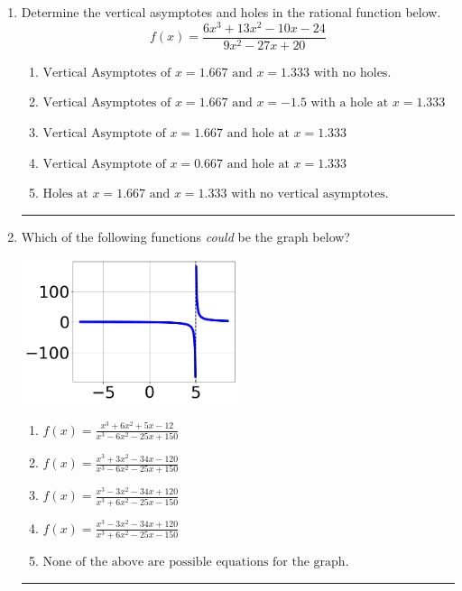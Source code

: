 \documentclass[14pt]{extbook}
\newcommand{\litem}[1]{\item#1\hspace*{-1cm}\rule{\textwidth}{0.4pt}}
\begin{document}
\begin{enumerate}
{\begin{enumerate}[label=\Alph*.]
\end{enumerate} }
\litem{
Determine the vertical asymptotes and holes in the rational function below.\[ f(x) = \frac{6x^{3} +13 x^{2} -10 x -24}{9x^{2} -27 x + 20} \]\begin{enumerate}[label=\Alph*.]
\item \( \text{Vertical Asymptotes of } x = 1.667 \text{ and } x = 1.333 \text{ with no holes.} \)
\item \( \text{Vertical Asymptotes of } x = 1.667 \text{ and } x = -1.5 \text{ with a hole at } x = 1.333 \)
\item \( \text{Vertical Asymptote of } x = 1.667 \text{ and hole at } x = 1.333 \)
\item \( \text{Vertical Asymptote of } x = 0.667 \text{ and hole at } x = 1.333 \)
\item \( \text{Holes at } x = 1.667 \text{ and } x = 1.333 \text{ with no vertical asymptotes.} \)

\end{enumerate} }
\litem{
Which of the following functions \textit{could} be the graph below?
\begin{center}
    \includegraphics[width=0.5\textwidth]{../Figures/identifyGraphOfRationalFunctionC.png}
\end{center}
\begin{enumerate}[label=\Alph*.]
\item \( f(x)=\frac{x^{3} +6 x^{2} +5 x -12}{x^{3} -6 x^{2} -25 x + 150} \)
\item \( f(x)=\frac{x^{3} +3 x^{2} -34 x -120}{x^{3} -6 x^{2} -25 x + 150} \)
\item \( f(x)=\frac{x^{3} -3 x^{2} -34 x + 120}{x^{3} +6 x^{2} -25 x -150} \)
\item \( f(x)=\frac{x^{3} -3 x^{2} -34 x + 120}{x^{3} +6 x^{2} -25 x -150} \)
\item \( \text{None of the above are possible equations for the graph.} \)


\end{enumerate}}
\end{enumerate}
\end{document}
